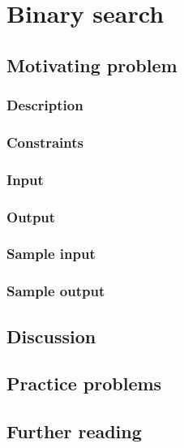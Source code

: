 \section{Binary search}

\subsection*{Motivating problem}

\subsubsection*{Description}

\subsubsection*{Constraints}

\subsubsection*{Input}

\subsubsection*{Output}

\subsubsection*{Sample input}

\subsubsection*{Sample output}

\subsection*{Discussion}

\subsection*{Practice problems}

\subsection*{Further reading}

